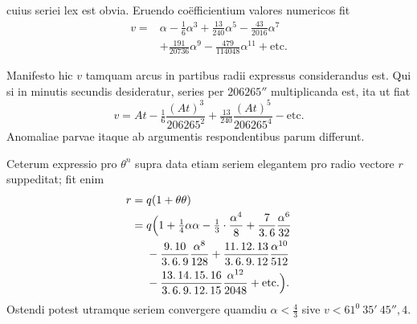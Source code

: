 cuius seriei lex est obvia. Eruendo coëfficientium valores numericos fit
\[
\begin{aligned}
v={}&\alpha-\tfrac16\alpha^3+\tfrac{13}{240}\alpha^5-\tfrac{43}{2016}\alpha^7\\
&+\tfrac{191}{20736}\alpha^9-\tfrac{479}{114048}\alpha^{11}+\text{etc.}
\end{aligned}
\]
\par
Manifesto hic \(v\) tamquam arcus in partibus radii expressus considerandus est. Qui si in minutis secundis desideratur, series per \(206265''\) multiplicanda est, ita ut fiat
\[
v=At-\tfrac16\frac{(At)^3}{206265^2}+\tfrac{13}{240}\frac{(At)^5}{206265^4}-\text{etc.}
\]
Anomaliae parvae itaque ab argumentis respondentibus parum differunt.
\par
Ceterum expressio pro \(\theta^n\) supra data etiam seriem elegantem pro radio vectore \(r\) suppeditat; fit enim
\[
\begin{aligned}
r={}&q(1+\theta\theta)\\
={}&q\Bigl(1+\tfrac14\alpha\alpha-\tfrac13\cdot\frac{\alpha^4}{8}+\frac{7}{3\mathpunct{.}6}\frac{\alpha^6}{32}\\
&-\frac{9\mathpunct{.}10}{3\mathpunct{.}6\mathpunct{.}9}\frac{\alpha^8}{128}
+\frac{11\mathpunct{.}12\mathpunct{.}13}{3\mathpunct{.}6\mathpunct{.}9\mathpunct{.}12}\frac{\alpha^{10}}{512}\\
&-\frac{13\mathpunct{.}14\mathpunct{.}15\mathpunct{.}16}{3\mathpunct{.}6\mathpunct{.}9\mathpunct{.}12\mathpunct{.}15}\frac{\alpha^{12}}{2048}+\text{etc.}\Bigr).
\end{aligned}
\]
Ostendi potest utramque seriem convergere quamdiu \(\alpha<\tfrac43\) sive \(v<61^0\ 35'\ 45''{,}4\).
\par
